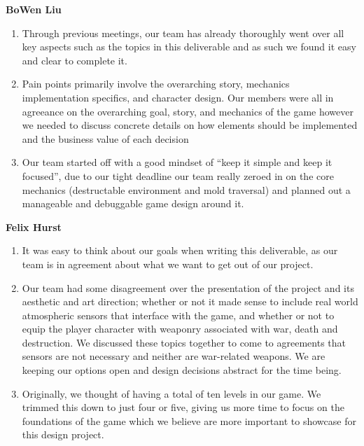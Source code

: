 \documentclass{article}
\begin{document}
\textbf{BoWen Liu}
\begin{enumerate}
\item{Through previous meetings, our team has already thoroughly went over all key aspects such as the topics in this deliverable and as such we found it easy and clear to complete it.}
\item{Pain points primarily involve the overarching story, mechanics implementation specifics, and character design. Our members were all in agreeance on the overarching goal, story, and mechanics of the game however we needed to discuss concrete details on how elements should be implemented and the business value of each decision}
\item{Our team started off with a good mindset of “keep it simple and keep it focused”, due to our tight deadline our team really zeroed in on the core mechanics (destructable environment and mold traversal) and planned out a manageable and debuggable game design around it.}
\end{enumerate}

\textbf{Felix Hurst}
\begin{enumerate}
\item{It was easy to think about our goals when writing this deliverable, as our team is in agreement about what we want to get out of our project.}
\item{Our team had some disagreement over the presentation of the project and its aesthetic and art direction; whether or not it made sense to include real world atmospheric sensors that interface with the game, and whether or not to equip the player character with weaponry associated with war, death and destruction. We discussed these topics together to come to agreements that sensors are not necessary and neither are war-related weapons. We are keeping our options open and design decisions abstract for the time being.}
\item{Originally, we thought of having a total of ten levels in our game. We trimmed this down to just four or five, giving us more time to focus on the foundations of the game which we believe are more important to showcase for this design project.}
\end{enumerate}
\end{document}
